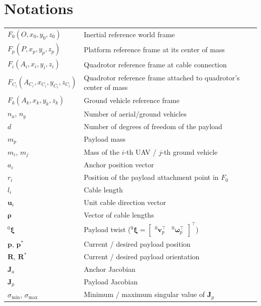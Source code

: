 \section*{Notations}
\noindent
\begin{tabularx}{\linewidth}{@{} l X @{}}
$F_0(O, x_0, y_0, z_0)$ & Inertial reference world frame \\
$F_p(P, x_p, y_p, z_p)$ & Platform reference frame at its center of mass \\
$F_i(A_i, x_i, y_i, z_i)$ & Quadrotor reference frame at cable connection \\
$F_{C_i}(A_{C_i}, x_{C_i}, y_{C_i}, z_{C_i})$ & Quadrotor reference frame attached to quadrotor's center of mass \\
$F_k(A_k, x_k, y_k, z_k)$ & Ground vehicle reference frame \\

$n_a$, $n_g$ & Number of aerial/ground vehicles \\
$d$ & Number of degrees of freedom of the payload \\
$m_p$ & Payload mass \\
$m_i$, $m_j$ & Mass of the $i$-th UAV / $j$-th ground vehicle \\

$a_i$ & Anchor position vector \\
$r_i$ & Position of the payload attachment point in $F_0$ \\
$l_i$ & Cable length \\
$\mathbf{u}_i$ & Unit cable direction vector \\
$\boldsymbol{\rho}$ & Vector of cable lengths \\
${}^0\boldsymbol{\xi}$ & Payload twist (${}^0\boldsymbol{\xi}
    =
    \begin{bmatrix}
        {}^0\mathbf{v}_p^\top & {}^0\boldsymbol{\omega}_p^\top
    \end{bmatrix}^\top$) \\
$\mathbf{p}$, $\mathbf{p}^*$ & Current / desired payload position \\
$\mathbf{R}$, $\mathbf{R}^*$ & Current / desired payload orientation \\
$\mathbf{J}_a$ & Anchor Jacobian \\
$\mathbf{J}_p$ & Payload Jacobian \\
$\sigma_{\min}$, $\sigma_{\max}$ & Minimum / maximum singular value of $\mathbf{J}_p$ \\


\end{tabularx}
